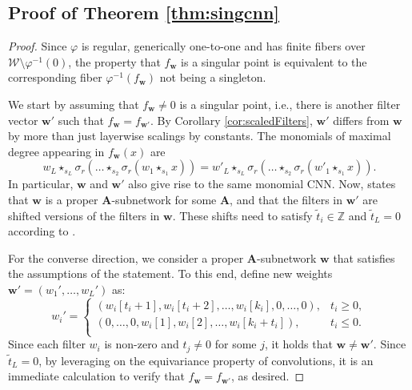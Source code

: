 \documentclass{article} %
\theoremstyle{plain}%
\theoremstyle{definition}
\theoremstyle{remark}
\begin{document}
\subsection{Proof of Theorem \ref{thm:singcnn}}\label{sec:proofsingcnn}
\begin{proof}
Since $\varphi$ is regular, generically one-to-one and has finite fibers over $ \mathcal{W} \setminus \varphi^{-1}(0)$, the property that $f_\mathbf{w}$ is a singular point is equivalent to the corresponding fiber $\varphi^{-1}(f_\mathbf{w})$ not being a singleton.

We start by assuming that $f_{\mathbf{w}} \neq 0$ is a singular point, i.e., there is another filter vector ${\mathbf{w}'}$ such that $f_{\mathbf{w}} = f_{\mathbf{w}'}$.
By Corollary \ref{cor:scaledFilters}, ${\mathbf{w}'}$ differs from $\mathbf{w}$ by more than just layerwise scalings by constants. 
The monomials of maximal degree appearing in $f_{\mathbf{w}}(x)$ are
\begin{equation}
    w_{L} \star_{s_{L}} \sigma_{r}\left(\dots \star_{s_2} \sigma_{r}(w_1 \star_{s_1} x)\right)= w'_{L} \star_{s_{L}} \sigma_{r}\left(\dots \star_{s_2} \sigma_{r}(w'_1 \star_{s_1} x)\right).
\end{equation}
In particular, $\mathbf{w}$ and ${\mathbf{w}'}$ also give rise to the same monomial CNN. 
Now, \citep[Theorem 4.6]{shahverdi2024geometryoptimizationpolynomialconvolutional} states that $\mathbf{w}$ is a proper $\mathbf{A}$-subnetwork for some $\mathbf{A}$, and that the filters in ${\mathbf{w}'}$ are shifted versions of the filters in $\mathbf{w}$.
These shifts need to satisfy $\tilde{t}_i \in \mathbb{Z}$ and $\tilde{t}_{L} = 0$ according to \citep[Remark 4.2]{shahverdi2024geometryoptimizationpolynomialconvolutional}.

For the converse direction, we consider a proper $\mathbf{A}$-subnetwork $\mathbf{w}$ that satisfies the assumptions of the statement.
To this end, define new weights $\mathbf{w}'=(w_1', \ldots, w_L')$ as: 
\begin{equation}
w_i' = \begin{cases}
    \left(w_i[{t}_i + 1 ], w_i[{t}_i + 2], \ldots, w_i[k_i], 0, \ldots, 0 \right), & {t}_i \geq 0, \\
        \left( 0, \ldots, 0, w_i[1], w_i[2], \ldots, w_i[k_i + {t}_i] \right), & {t}_i \leq 0. \\
\end{cases}
\end{equation}
Since each filter $w_i$ is non-zero and $t_j \neq 0$ for some $j$, it holds that $\mathbf{w} \not = \mathbf{w}'$. Since $\tilde{t}_L = 0$, by leveraging on the equivariance property of convolutions, it is an immediate calculation to verify that $f_\mathbf{w} = f_{\mathbf{w}'}$, as desired. 
\end{proof}
\end{document}
